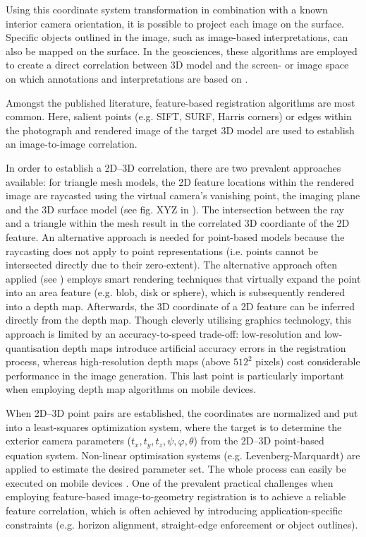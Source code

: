 \documentclass[review]{elsarticle}
\begin{document}
Using this coordinate system transformation in combination with a known interior camera orientation, it is possible to project each image on the surface. Specific objects outlined in the image, such as image-based interpretations, can also be mapped on the surface. In the geosciences, these algorithms are employed to create a direct correlation between 3D model and the screen- or image space on which annotations and interpretations are based on \cite{Kehl2016_ISPRS}.

Amongst the published literature, feature-based registration algorithms are most common. Here, salient points (e.g. SIFT, SURF, Harris corners) or edges within the photograph and rendered image of the target 3D model are used to establish an image-to-image correlation. 

In order to establish a 2D--3D correlation, there are two prevalent approaches available: for triangle mesh models, the 2D feature locations within the rendered image are raycasted using the virtual camera's vanishing point, the imaging plane and the 3D surface model (see fig. XYZ in \cite{Kehl2016_ISPRS}). The intersection between the ray and a triangle within the mesh result in the correlated 3D coordiante of the 2D feature. An alternative approach is needed for point-based models because the raycasting does not apply to point representations (i.e. points cannot be intersected directly due to their zero-extent). The alternative approach often applied (see \cite{X,Y,Z}) employs smart rendering techniques that virtually expand the point into an area feature (e.g. blob, disk or sphere), which is subsequently rendered into a depth map. Afterwards, the 3D coordinate of a 2D feature can be inferred directly from the depth map. Though cleverly utilising graphics technology, this approach is limited by an accuracy-to-speed trade-off: low-resolution and low-quantisation depth maps introduce artificial accuracy errors in the registration process, whereas high-resolution depth maps (above $512^2$ pixels) cost considerable performance in the image generation. This last point is particularly important when employing depth map algorithms on mobile devices.

When 2D--3D point pairs are established, the coordinates are normalized and put into a least-squares optimization system, where the target is to determine the exterior camera parameters ($t_x,t_y,t_z,\psi,\varphi,\theta$) from the 2D--3D point-based equation system. Non-linear optimisation systems (e.g. Levenberg-Marquardt) are applied to estimate the desired parameter set. The whole process can easily be executed on mobile devices \cite{Kehl2016_ISPRS}. One of the prevalent practical challenges when employing feature-based image-to-geometry registration is to achieve a reliable feature correlation, which is often achieved by introducing application-specific constraints (e.g. horizon alignment, straight-edge enforcement or object outlines).
\end{document}
